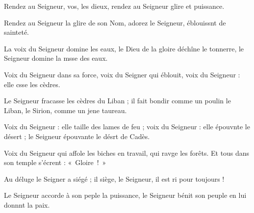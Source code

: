 \item Rendez au Seigneur, vos, les dieux,\psstar{} rendez au Seigneur glire et puissance.
\item Rendez au Seigneur la glire de son Nom,\psstar{} adorez le Seigneur, éblouissnt de sainteté.
\item La voix du Seigneur domine les eaux,\pscross{} le Dieu de la gloire déchîne le tonnerre,\psstar{} le Seigneur domine la msse des eaux.
\item Voix du Seigneur dans sa force,\pscross{} voix du Seigner qui éblouit,\psstar{} voix du Seigneur : elle csse les cèdres.
\item Le Seigneur fracasse les cèdres du Liban ;\pscross{} il fait bondir comme un poulin le Liban,\psstar{} le Sirion, comme un jene taureau.
\item Voix du Seigneur : elle taille des lames de feu ;\pscross{} voix du Seigneur : elle épouvnte le désert ;\psstar{} le Seigneur épouvante le désrt de Cadès.
\item Voix du Seigneur qui affole les biches en travail,\pscross{} qui ravge les forêts.\psstar{} Et tous dans son temple s’écrent : « Gloire ! »
\item Au déluge le Seigner a siégé ;\psstar{} il siège, le Seigneur, il est ri pour toujours !
\item Le Seigneur accorde à son peple la puissance,\psstar{} le Seigneur bénit son peuple en lui donnnt la paix.